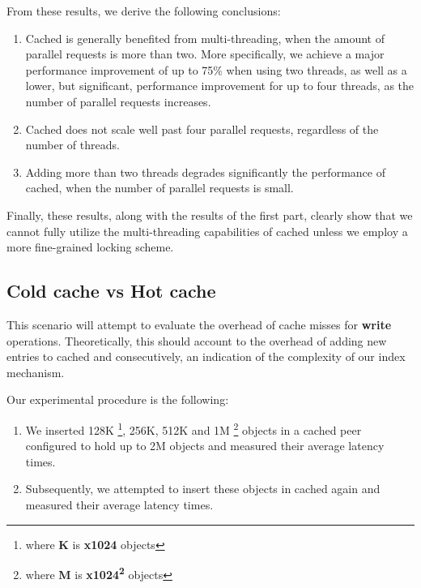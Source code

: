 
From these results, we derive the following conclusions:

\begin{enumerate}
	\item Cached is generally benefited from multi-threading, when the amount 
		of parallel requests is more than two. More specifically, we achieve a 
		major performance improvement of up to 75\% when using two threads, as 
		well as a lower, but significant, performance improvement for up to 
		four threads, as the number of parallel requests increases.
	\item Cached does not scale well past four parallel requests, regardless of 
		the number of threads.
	\item Adding more than two threads degrades significantly the performance 
		of cached, when the number of parallel requests is small.
\end{enumerate}

Finally, these results, along with the results of the first part, clearly show 
that we cannot fully utilize the multi-threading capabilities of cached unless 
we employ a more fine-grained locking scheme.

\subsection{Cold cache vs Hot cache}

This scenario will attempt to evaluate the overhead of cache misses for 
\textbf{write} operations. Theoretically, this should account to the overhead 
of adding new entries to cached and consecutively, an indication of the 
complexity of our index mechanism.

Our experimental procedure is the following:

\begin{enumerate}
	\item We inserted 128K
		\footnote{where \textbf{K} is \textbf{x1024} objects}, 256K, 512K and 
		1M
		\footnote{where \textbf{M} is \textbf{x1024\textsuperscript{2}} 
			objects}
		objects in a cached peer configured to hold up to 2M objects and 
		measured their average latency times.
	\item Subsequently, we attempted to insert these objects in cached again 
		and measured their average latency times.
\end{enumerate}

